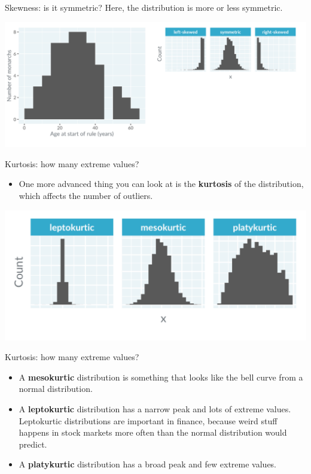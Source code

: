 \documentclass[
  ignorenonframetext,
]{beamer}
\providecommand{\tightlist}{%
  \setlength{\itemsep}{0pt}\setlength{\parskip}{0pt}}
\begin{document}
\begin{frame}{Skewness: is it symmetric?}
\label{skewness-is-it-symmetric-3}
Here, the distribution is more or less symmetric.

\includegraphics{../images/im13.png}
\end{frame}

\begin{frame}{Kurtosis: how many extreme values?}
\label{kurtosis-how-many-extreme-values}
\begin{itemize}
\tightlist
\item
  One more advanced thing you can look at is the \textbf{kurtosis} of
  the distribution, which affects the number of outliers.
\end{itemize}

\includegraphics{../images/im14.png}
\end{frame}

\begin{frame}{Kurtosis: how many extreme values?}
\label{kurtosis-how-many-extreme-values-1}
\begin{itemize}
\item
  A \textbf{mesokurtic} distribution is something that looks like the
  bell curve from a normal distribution.
\item
  A \textbf{leptokurtic} distribution has a narrow peak and lots of
  extreme values. Leptokurtic distributions are important in finance,
  because weird stuff happens in stock markets more often than the
  normal distribution would predict.
\item
  A \textbf{platykurtic} distribution has a broad peak and few extreme
  values.
\end{itemize}
\end{frame}
\end{document}
